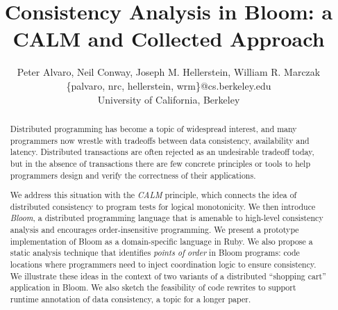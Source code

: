 \documentclass{sig-alternate}
\begin{document}
\title{Consistency Analysis in Bloom: a CALM and Collected Approach}

\author{
Peter Alvaro, Neil Conway, Joseph M. Hellerstein, William R. Marczak \vspace{12pt} \\
\{palvaro, nrc, hellerstein, wrm\}@cs.berkeley.edu \\
University of California, Berkeley
}

\maketitle

\begin{abstract}
Distributed programming has become a topic of widespread interest, and many programmers now wrestle with tradeoffs between data consistency, availability and latency.  Distributed transactions are often rejected as an undesirable tradeoff today, but in the absence of transactions there are few concrete principles or tools to help programmers design and verify the correctness of their applications.

We address this situation with the \emph{CALM} principle, which connects the idea of distributed consistency to program tests for logical monotonicity.  We then introduce \emph{Bloom}, a distributed programming language that is amenable to high-level consistency analysis and encourages order-insensitive programming.  We present a prototype implementation of Bloom as a domain-specific language in Ruby. We also propose a static analysis technique that identifies {\em points of order} in Bloom programs: code locations where programmers need to inject coordination logic to ensure consistency.  
We illustrate these ideas in the context of two variants
of a distributed ``shopping cart'' application in Bloom.  We also sketch the feasibility of code rewrites to support runtime annotation of data consistency, a topic for a longer paper.
\end{abstract}












\end{document}
